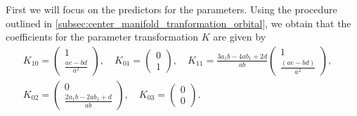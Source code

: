 First we will focus on the predictors for the parameters. Using the procedure
outlined in \cref{subsec:center_manifold_tranformation_orbital}, we obtain that the
coefficients for the parameter transformation $K$ are given by
\begin{equation*}
\begin{gathered}
				K_{10} = \begin{pmatrix} 1 \\ \frac{ae -bd}{a^2} \end{pmatrix},\quad
				K_{01} = \begin{pmatrix} 0 \\ 1 \end{pmatrix},\quad
				K_{11} = \frac{3a_1b-4ab_1+2d}{ab}\begin{pmatrix}  1
								\\ \frac{(ae-bd)}{a^2} \end{pmatrix},\quad \\
				K_{02} = \begin{pmatrix} 0 \\ \frac{2a_1b-2ab_1+d}{ab} \end{pmatrix},\quad
				K_{03} = \begin{pmatrix} 0 \\ 0 \end{pmatrix}.
\end{gathered} 
\end{equation*}

